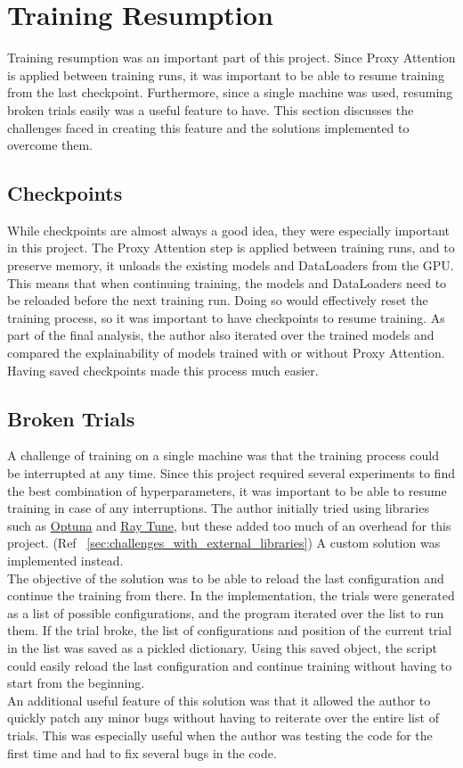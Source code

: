 \section{Training Resumption}
Training resumption was an important part of this project. Since Proxy Attention is applied between training runs, it was important to be able to resume training from the last checkpoint. Furthermore, since a single machine was used, resuming broken trials easily was a useful feature to have. This section discusses the challenges faced in creating this feature and the solutions implemented to overcome them.

\subsection{Checkpoints} \label{sec:checkpoints}
While checkpoints are almost always a good idea, they were especially important in this project. The Proxy Attention step is applied between training runs, and to preserve memory, it unloads the existing models and DataLoaders from the GPU. This means that when continuing training, the models and DataLoaders need to be reloaded before the next training run. Doing so would effectively reset the training process, so it was important to have checkpoints to resume training.
As part of the final analysis, the author also iterated over the trained models and compared the explainability of models trained with or without Proxy Attention. Having saved checkpoints made this process much easier.

\subsection{Broken Trials}
A challenge of training on a single machine was that the training process could be interrupted at any time. Since this project required several experiments to find the best combination of hyperparameters, it was important to be able to resume training in case of any interruptions. The author initially tried using libraries such as \href{https://github.com/optuna/optuna}{Optuna} and \href{https://github.com/ray-project/ray}{Ray Tune}, but these added too much of an overhead for this project. (Ref ~\ref{sec:challenges_with_external_libraries}) A custom solution was implemented instead.\\
The objective of the solution was to be able to reload the last configuration and continue the training from there. In the implementation, the trials were generated as a list of possible configurations, and the program iterated over the list to run them. If the trial broke, the list of configurations and position of the current trial in the list was saved as a pickled dictionary. Using this saved object, the script could easily reload the last configuration and continue training without having to start from the beginning.\\
An additional useful feature of this solution was that it allowed the author to quickly patch any minor bugs without having to reiterate over the entire list of trials. This was especially useful when the author was testing the code for the first time and had to fix several bugs in the code.

